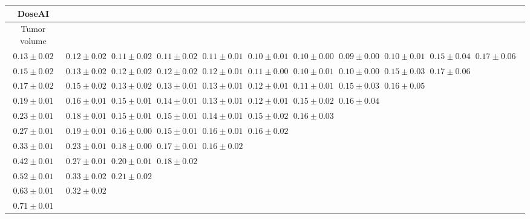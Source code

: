 \begin{table}[ht]
{{\begin{adjustbox}{width=\textwidth}
\begin{tabular}{cccccccccccc}
\hline
DoseAI &  &  &  &  &  &  &  &  &  & \\
\hline
Tumor volume &  &  &  &  &  &  &  &  &  & \\
\hline
$0.13 \pm 0.02$ & $0.12 \pm 0.02$ & $0.11 \pm 0.02$ & $0.11 \pm 0.02$ & $0.11 \pm 0.01$ & $0.10 \pm 0.01$ & $0.10 \pm 0.00$ & $0.09 \pm 0.00$ & $0.10 \pm 0.01$ & $0.15 \pm 0.04$ & $0.17 \pm 0.06$ &  \\
$0.15 \pm 0.02$ & $0.13 \pm 0.02$ & $0.12 \pm 0.02$ & $0.12 \pm 0.02$ & $0.12 \pm 0.01$ & $0.11 \pm 0.00$ & $0.10 \pm 0.01$ & $0.10 \pm 0.00$ & $0.15 \pm 0.03$ & $0.17 \pm 0.06$ &  &  \\
$0.17 \pm 0.02$ & $0.15 \pm 0.02$ & $0.13 \pm 0.02$ & $0.13 \pm 0.01$ & $0.13 \pm 0.01$ & $0.12 \pm 0.01$ & $0.11 \pm 0.01$ & $0.15 \pm 0.03$ & $0.16 \pm 0.05$ &  &  &  \\
$0.19 \pm 0.01$ & $0.16 \pm 0.01$ & $0.15 \pm 0.01$ & $0.14 \pm 0.01$ & $0.13 \pm 0.01$ & $0.12 \pm 0.01$ & $0.15 \pm 0.02$ & $0.16 \pm 0.04$ &  &  &  &  \\
$0.23 \pm 0.01$ & $0.18 \pm 0.01$ & $0.15 \pm 0.01$ & $0.15 \pm 0.01$ & $0.14 \pm 0.01$ & $0.15 \pm 0.02$ & $0.16 \pm 0.03$ &  &  &  &  &  \\
$0.27 \pm 0.01$ & $0.19 \pm 0.01$ & $0.16 \pm 0.00$ & $0.15 \pm 0.01$ & $0.16 \pm 0.01$ & $0.16 \pm 0.02$ &  &  &  &  &  &  \\
$0.33 \pm 0.01$ & $0.23 \pm 0.01$ & $0.18 \pm 0.00$ & $0.17 \pm 0.01$ & $0.16 \pm 0.02$ &  &  &  &  &  &  &  \\
$0.42 \pm 0.01$ & $0.27 \pm 0.01$ & $0.20 \pm 0.01$ & $0.18 \pm 0.02$ &  &  &  &  &  &  &  &  \\
$0.52 \pm 0.01$ & $0.33 \pm 0.02$ & $0.21 \pm 0.02$ &  &  &  &  &  &  &  &  &  \\
$0.63 \pm 0.01$ & $0.32 \pm 0.02$ &  &  &  &  &  &  &  &  &  &  \\
$0.71 \pm 0.01$ &  &  &  &  &  &  &  &  &  &  &  \\



\end{tabular}
\end{adjustbox}}}
\end{table}
